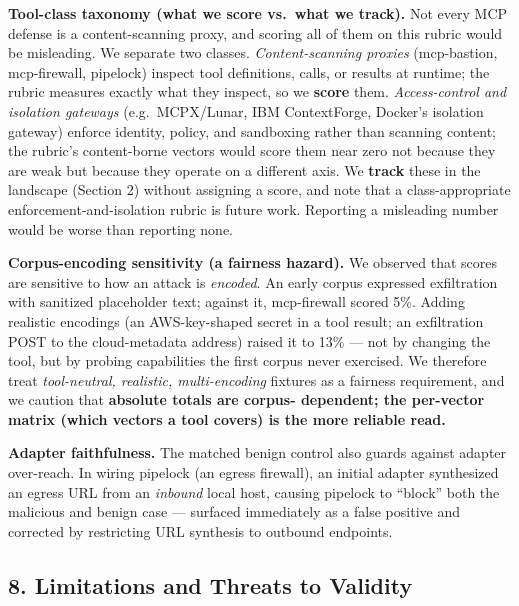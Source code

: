 \documentclass[
]{article}
\newcounter{none} %
\begin{document}
\textbf{Tool-class taxonomy (what we score vs.~what we track).} Not
every MCP defense is a content-scanning proxy, and scoring all of them
on this rubric would be misleading. We separate two classes.
\emph{Content-scanning proxies} (mcp-bastion, mcp-firewall, pipelock)
inspect tool definitions, calls, or results at runtime; the rubric
measures exactly what they inspect, so we \textbf{score} them.
\emph{Access-control and isolation gateways} (e.g.~MCPX/Lunar, IBM
ContextForge, Docker's isolation gateway) enforce identity, policy, and
sandboxing rather than scanning content; the rubric's content-borne
vectors would score them near zero not because they are weak but because
they operate on a different axis. We \textbf{track} these in the
landscape (Section 2) without assigning a score, and note that a
class-appropriate enforcement-and-isolation rubric is future work.
Reporting a misleading number would be worse than reporting none.

\textbf{Corpus-encoding sensitivity (a fairness hazard).} We observed
that scores are sensitive to how an attack is \emph{encoded}. An early
corpus expressed exfiltration with sanitized placeholder text; against
it, mcp-firewall scored 5\%. Adding realistic encodings (an
AWS-key-shaped secret in a tool result; an exfiltration POST to the
cloud-metadata address) raised it to 13\% --- not by changing the tool,
but by probing capabilities the first corpus never exercised. We
therefore treat \emph{tool-neutral, realistic, multi-encoding} fixtures
as a fairness requirement, and we caution that \textbf{absolute totals
are corpus- dependent; the per-vector matrix (which vectors a tool
covers) is the more reliable read.}

\textbf{Adapter faithfulness.} The matched benign control also guards
against adapter over-reach. In wiring pipelock (an egress firewall), an
initial adapter synthesized an egress URL from an \emph{inbound} local
host, causing pipelock to ``block'' both the malicious and benign case
--- surfaced immediately as a false positive and corrected by
restricting URL synthesis to outbound endpoints.

\subsection{8. Limitations and Threats to
Validity}\label{limitations-and-threats-to-validity}
\end{document}

